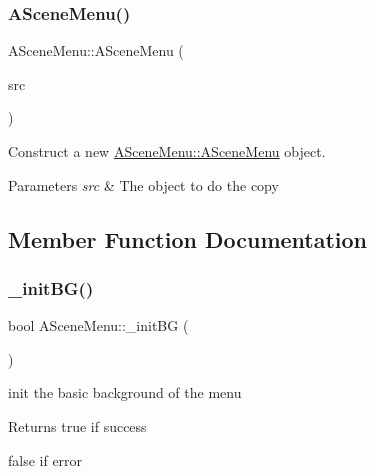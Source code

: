 \subsubsection{\texorpdfstring{A\+Scene\+Menu()}{ASceneMenu()}\hspace{0.1cm}{\footnotesize\ttfamily [2/2]}}
{\footnotesize\ttfamily A\+Scene\+Menu\+::\+A\+Scene\+Menu (\begin{DoxyParamCaption}\item[{\hyperlink{class_a_scene_menu}{A\+Scene\+Menu} const \&}]{src }\end{DoxyParamCaption})}



Construct a new \hyperlink{class_a_scene_menu_a97a8137c54f33e8f08adde2c2bb604c6}{A\+Scene\+Menu\+::\+A\+Scene\+Menu} object. 


\begin{DoxyParams}{Parameters}
{\em src} & The object to do the copy \\
\hline
\end{DoxyParams}


\subsection{Member Function Documentation}
\mbox{\label{class_a_scene_menu_aa54bec80fcc36b1607eeb1bb80ab0142}} 
\subsubsection{\texorpdfstring{\+\_\+init\+B\+G()}{\_initBG()}}
{\footnotesize\ttfamily bool A\+Scene\+Menu\+::\+\_\+init\+BG (\begin{DoxyParamCaption}{ }\end{DoxyParamCaption})\hspace{0.3cm}{\ttfamily [protected]}}



init the basic background of the menu 

\begin{DoxyReturn}{Returns}
true if success 

false if error 
\end{DoxyReturn}
\mbox{\label{class_a_scene_menu_a0dd22da4b527200c78ea2d4a07678840}} 

